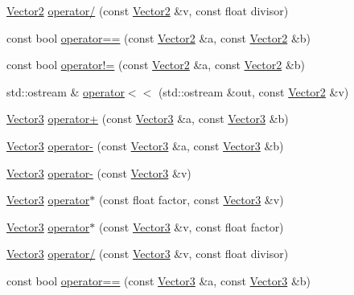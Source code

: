 \begin{DoxyCompactItemize}
\item 
\hyperlink{classprism_1_1_vector2}{Vector2} \hyperlink{namespaceprism_aea1ab02785c9d4d5ea560face252b75e}{operator/} (const \hyperlink{classprism_1_1_vector2}{Vector2} \&v, const float divisor)
\item 
const bool \hyperlink{namespaceprism_a311fc983ec89876189643e840d781974}{operator==} (const \hyperlink{classprism_1_1_vector2}{Vector2} \&a, const \hyperlink{classprism_1_1_vector2}{Vector2} \&b)
\item 
const bool \hyperlink{namespaceprism_a7e9d0b027a9e7d9e313affe5af91dabc}{operator!=} (const \hyperlink{classprism_1_1_vector2}{Vector2} \&a, const \hyperlink{classprism_1_1_vector2}{Vector2} \&b)
\item 
std\+::ostream \& \hyperlink{namespaceprism_a4616180b97f4288a3b3e28304efee020}{operator$<$$<$} (std\+::ostream \&out, const \hyperlink{classprism_1_1_vector2}{Vector2} \&v)
\item 
\hyperlink{classprism_1_1_vector3}{Vector3} \hyperlink{namespaceprism_a7ac90b31f235390d6feb818e3f88ecf0}{operator+} (const \hyperlink{classprism_1_1_vector3}{Vector3} \&a, const \hyperlink{classprism_1_1_vector3}{Vector3} \&b)
\item 
\hyperlink{classprism_1_1_vector3}{Vector3} \hyperlink{namespaceprism_a3beb56b334423e027f1ab185785695f8}{operator-\/} (const \hyperlink{classprism_1_1_vector3}{Vector3} \&a, const \hyperlink{classprism_1_1_vector3}{Vector3} \&b)
\item 
\hyperlink{classprism_1_1_vector3}{Vector3} \hyperlink{namespaceprism_a8f7cf835ff415e187e6881169803f502}{operator-\/} (const \hyperlink{classprism_1_1_vector3}{Vector3} \&v)
\item 
\hyperlink{classprism_1_1_vector3}{Vector3} \hyperlink{namespaceprism_a429cccc5eee454ba019045afb4a01e93}{operator$\ast$} (const float factor, const \hyperlink{classprism_1_1_vector3}{Vector3} \&v)
\item 
\hyperlink{classprism_1_1_vector3}{Vector3} \hyperlink{namespaceprism_aa1f2f6de8bf1b584cbb82062a607e167}{operator$\ast$} (const \hyperlink{classprism_1_1_vector3}{Vector3} \&v, const float factor)
\item 
\hyperlink{classprism_1_1_vector3}{Vector3} \hyperlink{namespaceprism_a87e022748076586917c38e83430df284}{operator/} (const \hyperlink{classprism_1_1_vector3}{Vector3} \&v, const float divisor)
\item 
const bool \hyperlink{namespaceprism_a2fc2a483f2e3ec622ad2c0ac9699fbcb}{operator==} (const \hyperlink{classprism_1_1_vector3}{Vector3} \&a, const \hyperlink{classprism_1_1_vector3}{Vector3} \&b)

\end{DoxyCompactItemize}
